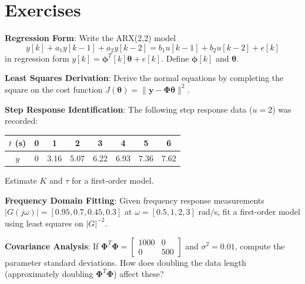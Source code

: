 \newpage
\section{Exercises}
\label{sec:sysid_exercises}

\begin{exercise}
\textbf{Regression Form}: Write the ARX(2,2) model
\begin{equation*}
y[k] + a_1 y[k-1] + a_2 y[k-2] = b_1 u[k-1] + b_2 u[k-2] + e[k]
\end{equation*}
in regression form $y[k] = \boldsymbol{\phi}^T[k]\boldsymbol{\theta} + e[k]$. Define $\boldsymbol{\phi}[k]$ and $\boldsymbol{\theta}$.
\end{exercise}

\begin{exercise}
\textbf{Least Squares Derivation}: Derive the normal equations by completing the square on the cost function $J(\boldsymbol{\theta}) = \|\mathbf{y} - \boldsymbol{\Phi}\boldsymbol{\theta}\|^2$.
\end{exercise}

\begin{exercise}
\textbf{Step Response Identification}: The following step response data ($u = 2$) was recorded:
\begin{center}
\begin{tabular}{cccccccc}
\toprule
$t$ (s) & 0 & 1 & 2 & 3 & 4 & 5 & 6 \\
\midrule
$y$ & 0 & 3.16 & 5.07 & 6.22 & 6.93 & 7.36 & 7.62 \\
\bottomrule
\end{tabular}
\end{center}
Estimate $K$ and $\tau$ for a first-order model.
\end{exercise}

\begin{exercise}
\textbf{Frequency Domain Fitting}: Given frequency response measurements $|G(j\omega)| = [0.95, 0.7, 0.45, 0.3]$ at $\omega = [0.5, 1, 2, 3]$ rad/s, fit a first-order model using least squares on $|G|^{-2}$.
\end{exercise}

\begin{exercise}
\textbf{Covariance Analysis}: If $\boldsymbol{\Phi}^T\boldsymbol{\Phi} = \begin{bmatrix} 1000 & 0 \\ 0 & 500 \end{bmatrix}$ and $\sigma^2 = 0.01$, compute the parameter standard deviations. How does doubling the data length (approximately doubling $\boldsymbol{\Phi}^T\boldsymbol{\Phi}$) affect these?
\end{exercise}

